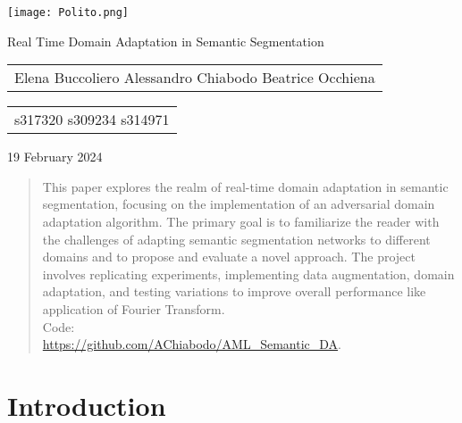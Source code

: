 \documentclass[10pt,twocolumn,letterpaper]{article}
\begin{document}
\begin{titlepage}
    \centering
    \texttt{[image: Polito.png]} %
    \vspace{1cm}
    
    \Huge Real Time Domain Adaptation in Semantic Segmentation
    \vspace{0.5cm}
    
    \Large
    \begin{tabular}{l}
        Elena Buccoliero \quad Alessandro Chiabodo \quad Beatrice Occhiena \\
    \end{tabular}

    \begin{tabular}{l}
        s317320 \quad \quad \quad \quad \quad \quad s309234 \quad \quad \quad \quad \quad \quad s314971 \\
    \end{tabular}
    
    \vspace{0.5cm}
    
    \large 19 February 2024 %

\end{titlepage}



\begin{abstract}
    This paper explores the realm of real-time domain adaptation in semantic segmentation, focusing on the implementation of an adversarial domain adaptation algorithm. The primary goal is to familiarize the reader with the challenges of adapting semantic segmentation networks to different domains and to propose and evaluate a novel approach. The project involves replicating experiments, implementing data augmentation, domain adaptation, and testing variations to improve overall performance like application of Fourier Transform.
    \\Code:\\\url{https://github.com/AChiabodo/AML_Semantic_DA}.
\end{abstract}

\section{Introduction}
\label{sec:intro}
\end{document}
